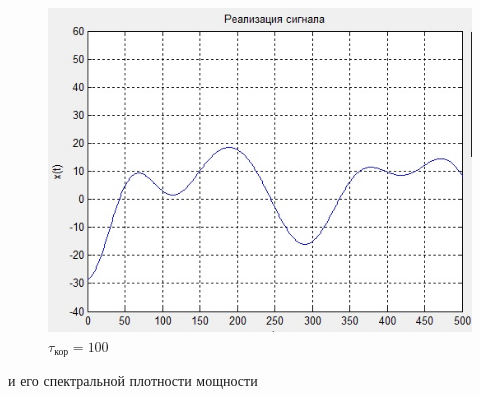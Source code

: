 \begin{figure}[H]
\begin{minipage}{0.3\linewidth}
	\includegraphics[width=\linewidth]{tasks/task1/realize100}
	\caption*{$\tau_\text{кор}=100$}
\end{minipage}
  \end{figure}
и его спектральной плотности мощности
